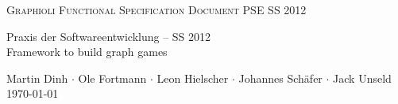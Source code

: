 \begin{titlepage}
\begin{center}
\fontsize{40}{50}\selectfont
        \vfill
        \textsc{Graphioli}
		\vfill
        \textsc{Functional Specification Document}
        \vfill
\LARGE
PSE SS 2012
  \vfill
 \newpage
 
 \null
 \vfill
 
 Praxis der Softwareentwicklung -- SS 2012 \\
 
  \Large
  Framework to build graph games \\
  \medskip
  \vspace{2cm}
  
    Martin Dinh $\cdot$ Ole Fortmann $\cdot$ Leon Hielscher $\cdot$ Johannes Schäfer $\cdot$ Jack Unseld
  \vspace{2cm} \\
  \today
\end{center}

  \vfill

\end{titlepage}